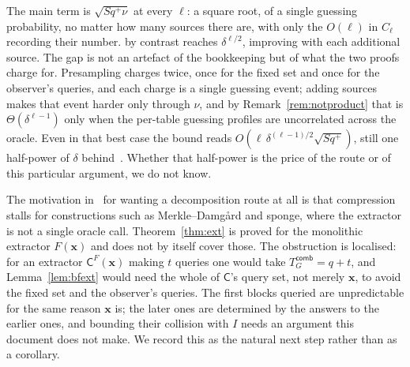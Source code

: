 \documentclass{conjura-conjecture}
\newcommand{\vx}{\mathbf{x}}
\newcommand{\Tcomb}{T^{\mathsf{comb}}_{G}}
\begin{document}
\begin{remark}\label{rem:ell}
The main term is $\sqrt{Sq^{+}\nu}$ at every $\ell$: a square root, of a
single guessing probability, no matter how many sources there are, with
only the $O(\ell)$ in $C_\ell$ recording their number.
\cite[Thm.~3]{CFHS} by contrast reaches $\delta^{\ell/2}$, improving with
each additional source. The gap is not an artefact of the bookkeeping but
of what the two proofs charge for. Presampling charges twice, once for the
fixed set and once for the observer's queries, and each charge is a single
guessing event; adding sources makes that event harder only through $\nu$,
and by Remark~\ref{rem:notproduct} that is $\Theta(\delta^{\ell-1})$ only
when the per-table guessing profiles are uncorrelated across the oracle.
Even in that best case the bound reads
$O(\ell\,\delta^{(\ell-1)/2}\sqrt{Sq^{+}})$, still one half-power of
$\delta$ behind~\cite[Thm.~3]{CFHS}. Whether that half-power is the price
of the route or of this particular argument, we do not know.
\end{remark}

\begin{remark}\label{rem:construction}
The motivation in~\cite[\S1.4]{CFHS} for wanting a decomposition route at
all is that compression stalls for constructions such as
Merkle--Damg\aa{}rd and sponge, where the extractor is not a single oracle
call. Theorem~\ref{thm:ext} is proved for the monolithic extractor
$F(\vx)$ and does not by itself cover those. The obstruction is localised:
for an extractor $\mathsf{C}^{F}(\vx)$ making $t$ queries one would take
$\Tcomb = q+t$, and Lemma~\ref{lem:bfext} would need the whole of
$\mathsf{C}$'s query set, not merely $\vx$, to avoid the fixed set and the
observer's queries. The first blocks queried are unpredictable for the
same reason $\vx$ is; the later ones are determined by the answers to the
earlier ones, and bounding their collision with $I$ needs an argument this
document does not make. We record this as the natural next step rather
than as a corollary.
\end{remark}
\end{document}

